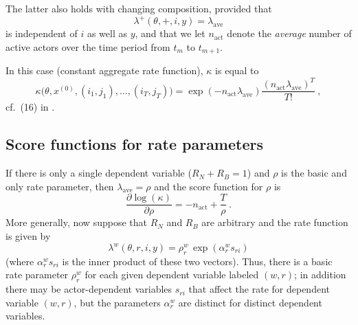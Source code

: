 \documentclass[a4paper,12pt,fleqn]{article}
\begin{document}
\begin{appendices}
The latter also holds with changing composition,
provided that
\[
   \lambda^+(\theta, +,i, y) = \lambda_{\text{ave}}
\]
is independent of $i$ as well as $y$, and that we let $n_{\text{act}}$
denote the \emph{average} number of active actors over the time period
from $t_{m}$ to $t_{m+1}$.

In this case (constant aggregate rate function),
$\kappa$ is equal to
\begin{equation}
   \kappa\big(\theta, x^{(0)},(i_1, j_1), \ldots, (i_T,j_T) \big) =
           \exp(-n_{\text{act}} \lambda_{\text{ave}} ) \frac{(n_{\text{act}} \lambda_{\text{ave}} )^T}{T!} \ ,
                                                           \label{kappa4}
\end{equation}
cf.\ (16) in \citet{SnijdersEA10a}.


\subsection{Score functions for rate parameters}

If there is only a single dependent variable ($R_N + R_B = 1$) and
$\rho$ is the basic and only rate parameter,
then $\lambda_{\text{ave}} = \rho$ and
the score function for $\rho$ is
\begin{equation}
\frac{\partial \log(\kappa)}{\partial \rho} =
   -n_{\text{act}} + \frac{T}{\rho} \  . \label{score1}
\end{equation}
More generally, now suppose that $R_N$ and $R_B$
are arbitrary and the rate function is given by
\begin{equation}
 \lambda^w(\theta, r,i, y) = \rho^w_r \, \exp(\alpha^w_{r} s_{ri} )
               \label{kappa5}
\end{equation}
(where $\alpha^w_{r} s_{ri}$  is the inner product of these two vectors).
Thus, there is a basic rate parameter $\rho^w_r$ for each given dependent
variable labeled $(w,r)$; in addition there may be actor-dependent variables $s_{ri}$ that
affect the rate for dependent variable $(w,r)$, but the parameters $\alpha^w_{r}$
are distinct for distinct dependent variables.


\end{appendices}
\end{document}
